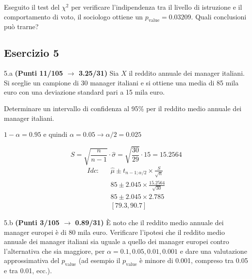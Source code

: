 \documentclass[
  11pt,
]{book}
\theoremstyle{mytheoremstyle}
\theoremstyle{mydefstyle}
\newenvironment{sol}
  {
  \begin{tcolorbox}[enhanced,breakable,arc=0.1mm,boxrule=1pt,colback=white,colframe=iblue,
  title=\bf \fontfamily{lmss}\selectfont \hspace{.5 cm} Soluzione,drop fuzzy shadow]

}{
\end{tcolorbox}
  }
\begin{document}
Eseguito il test del \(\chi^2\) per verificare l'indipendenza tra il livello di istruzione e il comportamento di voto, il sociologo ottiene un \(p_\text{value}=0.03209\). Quali conclusioni può trarne?

\subsection{Esercizio 5}\label{esercizio-5-38}

5.a \textbf{(Punti 11/105 \(\rightarrow\) 3.25/31)} Sia \(X\) il reddito annuale dei manager italiani.
Si sceglie un campione di 30 manager italiani e si ottiene una
media di 85 mila euro con una deviazione standard pari a 15 mila euro.

Determinare un intervallo di confidenza al 95\% per
il reddito medio annuale dei manager italiani.

\begin{sol}
\(1-\alpha =0.95\) e quindi \(\alpha=0.05\rightarrow \alpha/2=0.025\)

\[
      S  =\sqrt{\frac {n}{n-1}}\cdot\hat\sigma =
     \sqrt{\frac { 30 }{ 29 }}\cdot 15 = 15.2564 
\]
\begin{eqnarray*}
  Idc: & &  \hat\mu \pm  t_{n-1;\alpha/2} \times \frac{S}{\sqrt{n}} \\
     & &  85 \pm  2.045 \times \frac{ 15.2564 }{\sqrt{ 30 }} \\
     & &  85 \pm  2.045 \times  2.785 \\
     & & [ 79.3 ,  90.7 ]
\end{eqnarray*}

\end{sol}

5.b \textbf{(Punti 3/105 \(\rightarrow\) 0.89/31)} È noto che il reddito medio annuale dei manager europei
è di 80 mila euro.
Verificare l'ipotesi
che il reddito medio annuale dei manager italiani sia uguale a quello
dei manager europei contro l'alternativa che sia maggiore, per \(\alpha=0.1,0.05,0.01,0.001\) e dare una valutazione approssimativa del \(p_\text{value}\) (ad esempio il \(p_\text{value}\) è minore di 0.001, compreso tra 0.05 e tra 0.01, ecc.).
\end{document}
